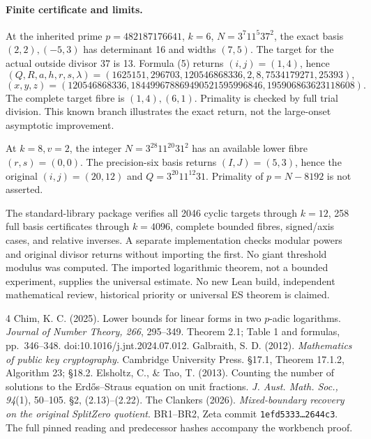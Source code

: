 \documentclass[10pt,a4paper]{article}
\begin{document}
\paragraph{Finite certificate and limits.}
At the inherited prime $p=482187176641$, $k=6$,
$N=3^7 11^5 37^2$, the exact basis $(2,2),(-5,3)$ has determinant 16 and
widths $(7,5)$. The target for the actual outside divisor 37 is 13. Formula
(5) returns $(i,j)=(1,4)$, hence
\[
 (Q,R,a,h,r,s,\lambda)
 =(1625151,296703,120546868336,2,8,7534179271,25393),
\]
\[
 (x,y,z)=(120546868336,184499678869490521595996846,195906863623118608).
\]
The complete target fibre is $(1,4),(6,1)$. Primality is checked by full
trial division. This known branch illustrates the exact return, not the
large-onset asymptotic improvement.

At $k=8,v=2$, the integer $N=3^{28}11^{20}31^2$ has an available lower
fibre $(r,s)=(0,0)$. The precision-six basis returns $(I,J)=(5,3)$,
hence the original $(i,j)=(20,12)$ and $Q=3^{20}11^{12}31$.
Primality of $p=N-8192$ is not asserted.

The standard-library package verifies all 2046 cyclic targets through $k=12$,
258 full basis certificates through $k=4096$, complete bounded fibres,
signed/axis cases, and relative inverses. A separate implementation checks
modular powers and original divisor returns without importing the first.
No giant threshold modulus was computed. The imported logarithmic theorem,
not a bounded experiment, supplies the universal estimate. No new Lean build,
independent mathematical review, historical priority or universal ES theorem
is claimed.

\begingroup\footnotesize
\begin{thebibliography}{4}
 Chim, K. C. (2025). Lower bounds for linear forms in two $p$-adic
logarithms. \emph{Journal of Number Theory, 266}, 295--349.
Theorem 2.1; Table 1 and formulas, pp.~346--348.
doi:10.1016/j.jnt.2024.07.012.
 Galbraith, S. D. (2012). \emph{Mathematics of public key
cryptography}. Cambridge University Press. \S17.1, Theorem 17.1.2, Algorithm 23;
\S18.2.
 Elsholtz, C., \& Tao, T. (2013). Counting the number of solutions
to the Erd\H{o}s--Straus equation on unit fractions. \emph{J. Aust. Math. Soc.,
94}(1), 50--105. \S2, (2.13)--(2.22).
 The Clankers (2026). \emph{Mixed-boundary recovery on the
original SplitZero quotient}. BR1--BR2, Zeta commit \texttt{1efd5333\ldots2644c3}.
The full pinned reading and predecessor hashes accompany the workbench proof.
\end{thebibliography}\endgroup
\end{document}
